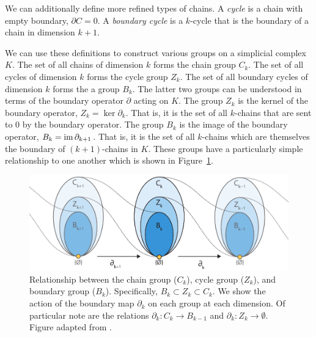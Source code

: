 We can additionally define more refined types of chains.
A \emph{cycle} is a chain with empty boundary, $\partial C=0$.
A \emph{boundary cycle} is a $k$-cycle that is the boundary of a chain in dimension $k+1$.

We can use these definitions to construct various groups on a simplicial complex $K$.
The set of all chains of dimension $k$ forms the chain group $C_{k}$.
The set of all cycles of dimension $k$ forms the cycle group $Z_{k}$.
The set of all boundary cycles of dimension $k$ forms the a group $B_{k}$.
The latter two groups can be understood in terms of the boundary operator $\partial$ acting on $K$.
The group $Z_{k}$ is the kernel of the boundary operator, $Z_{k}=\ker\partial_{k}$.
That is, it is the set of all $k$-chains that are sent to $0$ by the boundary operator.
The group $B_{k}$ is the image of the boundary operator, $B_{k}=\operatorname{im}\partial_{k+1}$.
That is, it is the set of all $k$-chains which are themselves the boundary of $(k+1)$-chains in $K$.
These groups have a particularly simple relationship to one another which is shown in Figure~\ref{fig:bg:chain_complex_maps}.



\begin{figure}
\centering
\includegraphics[]{fig/background/chain_complex_maps.pdf}
\caption[Relationship between the chain group, cycle group, and boundary group]{Relationship between the chain group ($C_k$), cycle group ($Z_k$), and boundary group ($B_k$). Specifically, $B_{k} \subset Z_{k} \subset C_{k}$. We show the action of the boundary map $\partial_k$ on each group at each dimension. Of particular note are the relations $\partial_{k} : C_{k} \rightarrow B_{k-1}$ and $\partial_{k} : Z_{k} \rightarrow \emptyset$. Figure adapted from \cite{Fasy:2014}.}
\label{fig:bg:chain_complex_maps}
\end{figure}

